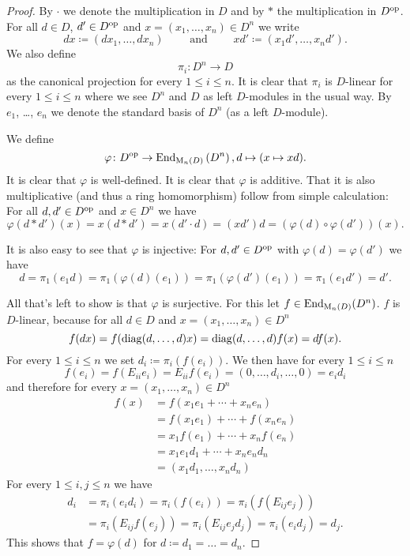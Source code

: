 \begin{proof}
 By $\cdot$ we denote the multiplication in $D$ and by $*$ the multiplication in $D^{\mathrm{op}}$. For all $d \in D$, $d' \in D^{\mathrm{op}}$ and $x = (x_1, \dotsc, x_n) \in D^n$ we write
 \[
  d x \coloneqq (d x_1, \dotsc, d x_n)
  \qquad \text{ and } \qquad
  x d' \coloneqq (x_1 d', \dotsc, x_n d'). 
 \]
 We also define
 \[
  \pi_i \colon D^n \to D
 \]
 as the canonical projection for every $1 \leq i \leq n$. It is clear that $\pi_i$ is $D$-linear for every $1 \leq i \leq n$ where we see $D^n$ and $D$ as left $D$-modules in the usual way. By $e_1$, \dots, $e_n$ we denote the standard basis of $D^n$ (as a left $D$-module).
 
 We define
 \[
  \varphi \colon D^{\mathrm{op}} \to \operatorname{End}_{\operatorname{M}_n(D)}\left( D^n \right), d \mapsto (x \mapsto x d).
 \]
 It is clear that $\varphi$ is well-defined. It is clear that $\varphi$ is additive. That it is also multiplicative (and thus a ring homomorphism) follow from simple calculation: For all $d,d' \in D^{\mathrm{op}}$ and $x \in D^n$ we have
 \[
  \varphi(d * d')(x)
  = x (d * d')
  = x (d' \cdot d)
  = (x d') d
  = \left( \varphi(d) \circ \varphi(d') \right)(x).
 \]
 
 It is also easy to see that $\varphi$ is injective: For $d, d' \in D^{\mathrm{op}}$ with $\varphi(d) = \varphi(d')$ we have
 \[
  d = \pi_1(e_1 d) = \pi_1(\varphi(d)(e_1)) = \pi_1(\varphi(d')(e_1)) = \pi_1(e_1 d') = d'.
 \]
 
 All that’s left to show is that $\varphi$ is surjective. For this let $f \in \operatorname{End}_{\operatorname{M}_n(D)}(D^n)$. $f$ is $D$-linear, because for all $d \in D$ and $x = (x_1, \dotsc, x_n) \in D^n$
 \[
  f(dx)
  = f( \operatorname{diag}(d, \dotsc, d) x)
  = \operatorname{diag}(d, \dotsc, d) f(x)
  = d f(x).
 \]
 For every $1 \leq i \leq n$ we set $d_i \coloneqq \pi_i(f(e_i))$. We then have for every $1 \leq i \leq n$
 \[
  f(e_i)
  = f(E_{ii} e_i)
  = E_{ii} f(e_i)
  = (0, \dotsc, d_i, \dotsc, 0)
  = e_i d_i 
 \]
 and therefore for every $x = (x_1, \dotsc, x_n) \in D^n$
 \begin{align*}
  f(x)
  &= f(x_1 e_1 + \dotsb + x_n e_n) \\
  &= f(x_1 e_1) + \dotsb + f(x_n e_n) \\
  &= x_1 f(e_1) + \dotsb + x_n f(e_n) \\
  &= x_1 e_1 d_1 + \dotsb + x_n e_n d_n \\
  &= (x_1 d_1, \dotsc, x_n d_n)
 \end{align*}
 For every $1 \leq i,j \leq n$ we have
 \begin{align*}
  d_i
  &= \pi_i(e_i d_i)
  = \pi_i(f(e_i))
  = \pi_i(f(E_{ij} e_j)) \\
  &= \pi_i(E_{ij} f(e_j))
  = \pi_i(E_{ij} e_j d_j)
  = \pi_i(e_i d_j)
  = d_j.
 \end{align*}   
 This shows that $f = \varphi(d)$ for $d \coloneqq d_1 = \dotsc = d_n$.
\end{proof}


